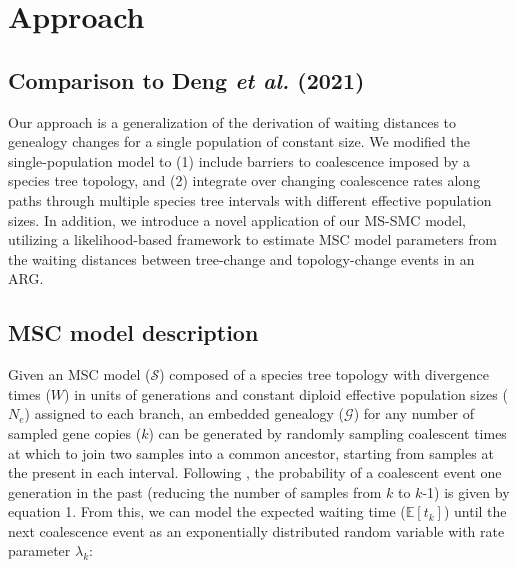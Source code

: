 \documentclass[11pt]{article}
\begin{document}


\section{Approach}
\subsection{Comparison to Deng \emph{et al.} (2021)} 

Our approach is a generalization of the \citet{deng_distribution_2021} derivation 
of waiting distances to genealogy changes for a single population of constant size. 
We modified the single-population model to (1) include barriers to coalescence imposed
by a species tree topology, and (2) integrate over changing coalescence rates along
paths through multiple species tree intervals with different effective population 
sizes. 
In addition, we introduce a novel application of our MS-SMC model, utilizing
a likelihood-based framework to estimate MSC model parameters from the waiting
distances between tree-change and topology-change events in an ARG.


\subsection{MSC model description}
Given an MSC model ($\mathcal{S}$) composed of a species tree topology with divergence
times ($W$) in units of generations and constant diploid effective population 
sizes ($N_e$) assigned to each branch, an embedded genealogy ($\mathcal{G}$) for 
any number of sampled gene copies ($k$) can be generated
by randomly sampling coalescent times at which to join two samples into a 
common ancestor, starting from samples at the present in each interval.
Following \citet{kingman1982coalescent}, the probability of a 
coalescent event one generation in the past (reducing the 
number of samples from $k$ to $k$-1) 
is given by equation 1. From this, we can model the expected 
waiting time ($\mathbb{E}[t_k]$) until the next coalescence event as an 
exponentially distributed random variable with rate parameter $\lambda_k$:
\end{document}
